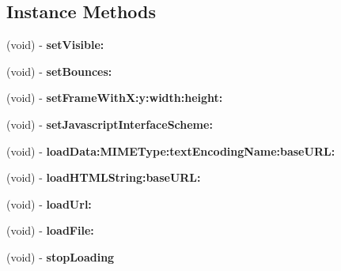 \subsection*{Instance Methods}
\begin{DoxyCompactItemize}
\item 
\mbox{\label{interfaceUIWebViewWrapper_a8fc5a7c15461fee77f63f30f1d4e198e}} 
(void) -\/ {\bfseries set\+Visible\+:}
\item 
\mbox{\label{interfaceUIWebViewWrapper_aceec426dc8bca4cf18c1dc368f9991be}} 
(void) -\/ {\bfseries set\+Bounces\+:}
\item 
\mbox{\label{interfaceUIWebViewWrapper_a37c6c5b4599eede45a408922f03d5fd2}} 
(void) -\/ {\bfseries set\+Frame\+With\+X\+:y\+:width\+:height\+:}
\item 
\mbox{\label{interfaceUIWebViewWrapper_ac3939ee47306c2f8507c3cca59059d5d}} 
(void) -\/ {\bfseries set\+Javascript\+Interface\+Scheme\+:}
\item 
\mbox{\label{interfaceUIWebViewWrapper_a6bcec909f966ca92aa2f33eb2467193c}} 
(void) -\/ {\bfseries load\+Data\+:\+M\+I\+M\+E\+Type\+:text\+Encoding\+Name\+:base\+U\+R\+L\+:}
\item 
\mbox{\label{interfaceUIWebViewWrapper_ab48fb83ff857f4c6bccfb85d7fc1833e}} 
(void) -\/ {\bfseries load\+H\+T\+M\+L\+String\+:base\+U\+R\+L\+:}
\item 
\mbox{\label{interfaceUIWebViewWrapper_ace65c56829078d93572e077ba0298519}} 
(void) -\/ {\bfseries load\+Url\+:}
\item 
\mbox{\label{interfaceUIWebViewWrapper_a27487c8490b0d9c5756f1c3dad00b4bc}} 
(void) -\/ {\bfseries load\+File\+:}
\item 
\mbox{\label{interfaceUIWebViewWrapper_a4808dcb635b40258cec866aa5589fa8b}} 
(void) -\/ {\bfseries stop\+Loading}
\item 
\mbox{\label{interfaceUIWebViewWrapper_a8d2f4112cbcbb2f5b6c3708cd644af3e}} 

\end{DoxyCompactItemize}
